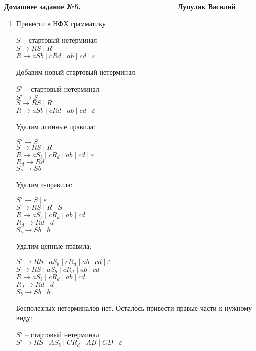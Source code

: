 \documentclass[12pt]{article}
\def\to{\rightarrow}
\def\b{\textbf}
\newenvironment{Problems}{
	\begin{enumerate}[]
	}{       
	\end{enumerate}
}
\begin{document}
	\b{Домашнее задание №5.\ \ \ \ \ \ \ \ \ \ \ \ \ \ \ \ \ \ \ \ \ \ \ \  Лупуляк Василий}
	
	\begin{Problems}
		\item [\fbox{2.}] Привести в НФХ грамматику 
		\begin{center}
			$S$ -- стартовый нетерминал\\
			$S \to RS \mid R$\\
			$R \to aSb \mid cRd \mid ab \mid cd \mid \varepsilon$
		\end{center}
		Добавим новый стартовый нетерминал: 
		\begin{center}
			$S'$ -- стартовый нетерминал\\
			$S' \to S$\\
			$S \to RS \mid R$\\
			$R \to aSb \mid cRd \mid ab \mid cd \mid \varepsilon$
		\end{center}
		Удалим длинные правила: 
		\begin{center}
			$S' \to S$\\
			$S \to RS \mid R$\\
			$R \to aS_b \mid cR_d \mid ab \mid cd \mid \varepsilon$\\
			$R_d \to Rd$\\
			$S_b \to Sb$
		\end{center}
		Удалим $\varepsilon$-правила:
		\begin{center}
			$S' \to S \mid \varepsilon$\\
			$S \to RS \mid R \mid S$\\
			$R \to aS_b \mid cR_d \mid ab \mid cd$\\
			$R_d \to Rd \mid d$\\
			$S_b \to Sb \mid b$
		\end{center}
		Удалим цепные правила:
		\begin{center}
			$S' \to RS \mid aS_b \mid cR_d \mid ab \mid cd \mid \varepsilon$\\
			$S \to RS \mid aS_b \mid cR_d \mid ab \mid cd$\\
			$R \to aS_b \mid cR_d \mid ab \mid cd$\\
			$R_d \to Rd \mid d$\\
			$S_b \to Sb \mid b$
		\end{center}
		Бесполезных нетерминалов нет. Осталось привести правые части к нужному виду:
		\begin{center}
			$S'$ -- стартовый нетерминал\\
			$S' \to RS \mid AS_b \mid CR_d \mid AB \mid CD \mid \varepsilon$\\

\end{center}
\end{Problems}
\end{document}
